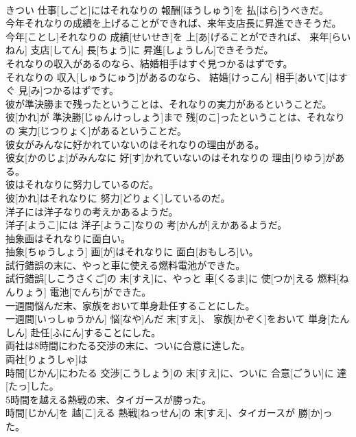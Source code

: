 \documentclass[8pt]{extreport}
\begin{document}
\begin{CJK}{UTF8}{min}
\\	きつい 仕事[しごと]にはそれなりの 報酬[ほうしゅう]を 払[はら]うべきだ。
\\	今年それなりの成績を上げることができれば、来年支店長に昇進できそうだ。	
\\	今年[ことし]それなりの 成績[せいせき]を 上[あ]げることができれば、 来年[らいねん] 支店[してん] 長[ちょう]に 昇進[しょうしん]できそうだ。
\\	それなりの収入があるのなら、結婚相手はすぐ見つかるはずです。	
\\	それなりの 収入[しゅうにゅう]があるのなら、 結婚[けっこん] 相手[あいて]はすぐ 見[み]つかるはずです。
\\	彼が準決勝まで残ったということは、それなりの実力があるということだ。	
\\	彼[かれ]が 準決勝[じゅんけっしょう]まで 残[のこ]ったということは、それなりの 実力[じつりょく]があるということだ。
\\	彼女がみんなに好かれていないのはそれなりの理由がある。	
\\	彼女[かのじょ]がみんなに 好[す]かれていないのはそれなりの 理由[りゆう]がある。
\\	彼はそれなりに努力しているのだ。	
\\	彼[かれ]はそれなりに 努力[どりょく]しているのだ。
\\	洋子には洋子なりの考えかあるようだ。	
\\	洋子[ようこ]には 洋子[ようこ]なりの 考[かんが]えかあるようだ。
\\	抽象画はそれなりに面白い。	
\\	抽象[ちゅうしょう] 画[が]はそれなりに 面白[おもしろ]い。
\\	試行錯誤の末に、やっと車に使える燃料電池ができた。	
\\	試行錯誤[しこうさくご]の 末[すえ]に、やっと 車[くるま]に 使[つか]える 燃料[ねんりょう] 電池[でんち]ができた。
\\	一週間悩んだ末、家族をおいて単身赴任することにした。	
\\	一週間[いっしゅうかん] 悩[なや]んだ 末[すえ]、 家族[かぞく]をおいて 単身[たんしん] 赴任[ふにん]することにした。
\\	両社は8時間にわたる交渉の末に、ついに合意に達した。	
\\	両社[りょうしゃ]は 
\\	時間[じかん]にわたる 交渉[こうしょう]の 末[すえ]に、ついに 合意[ごうい]に 達[たっ]した。
\\	5時間を越える熱戦の末、タイガースが勝った。	
\\	時間[じかん]を 越[こ]える 熱戦[ねっせん]の 末[すえ]、タイガースが 勝[か]った。

\end{CJK}
\end{document}
